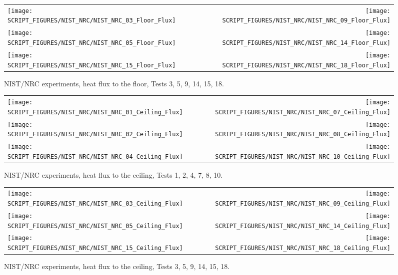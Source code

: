 \begin{figure}[p]
\begin{tabular*}{\textwidth}{l@{\extracolsep{\fill}}r}
\texttt{[image: SCRIPT\_FIGURES/NIST\_NRC/NIST\_NRC\_03\_Floor\_Flux]} &
\texttt{[image: SCRIPT\_FIGURES/NIST\_NRC/NIST\_NRC\_09\_Floor\_Flux]} \\
\texttt{[image: SCRIPT\_FIGURES/NIST\_NRC/NIST\_NRC\_05\_Floor\_Flux]} &
\texttt{[image: SCRIPT\_FIGURES/NIST\_NRC/NIST\_NRC\_14\_Floor\_Flux]} \\
\texttt{[image: SCRIPT\_FIGURES/NIST\_NRC/NIST\_NRC\_15\_Floor\_Flux]} &
\texttt{[image: SCRIPT\_FIGURES/NIST\_NRC/NIST\_NRC\_18\_Floor\_Flux]}
\end{tabular*}
\caption{NIST/NRC experiments, heat flux to the floor, Tests 3, 5, 9, 14, 15, 18.}
\label{NIST_NRC_Floor_Flux_Open}
\end{figure}


\begin{figure}[p]
\begin{tabular*}{\textwidth}{l@{\extracolsep{\fill}}r}
\texttt{[image: SCRIPT\_FIGURES/NIST\_NRC/NIST\_NRC\_01\_Ceiling\_Flux]} &
\texttt{[image: SCRIPT\_FIGURES/NIST\_NRC/NIST\_NRC\_07\_Ceiling\_Flux]} \\
\texttt{[image: SCRIPT\_FIGURES/NIST\_NRC/NIST\_NRC\_02\_Ceiling\_Flux]} &
\texttt{[image: SCRIPT\_FIGURES/NIST\_NRC/NIST\_NRC\_08\_Ceiling\_Flux]} \\
\texttt{[image: SCRIPT\_FIGURES/NIST\_NRC/NIST\_NRC\_04\_Ceiling\_Flux]} &
\texttt{[image: SCRIPT\_FIGURES/NIST\_NRC/NIST\_NRC\_10\_Ceiling\_Flux]}
\end{tabular*}
\caption{NIST/NRC experiments, heat flux to the ceiling, Tests 1, 2, 4, 7, 8, 10.}
\label{NIST_NRC_Ceiling_Flux_Closed}
\end{figure}

\begin{figure}[p]
\begin{tabular*}{\textwidth}{l@{\extracolsep{\fill}}r}
\texttt{[image: SCRIPT\_FIGURES/NIST\_NRC/NIST\_NRC\_03\_Ceiling\_Flux]} &
\texttt{[image: SCRIPT\_FIGURES/NIST\_NRC/NIST\_NRC\_09\_Ceiling\_Flux]} \\
\texttt{[image: SCRIPT\_FIGURES/NIST\_NRC/NIST\_NRC\_05\_Ceiling\_Flux]} &
\texttt{[image: SCRIPT\_FIGURES/NIST\_NRC/NIST\_NRC\_14\_Ceiling\_Flux]} \\
\texttt{[image: SCRIPT\_FIGURES/NIST\_NRC/NIST\_NRC\_15\_Ceiling\_Flux]} &
\texttt{[image: SCRIPT\_FIGURES/NIST\_NRC/NIST\_NRC\_18\_Ceiling\_Flux]}
\end{tabular*}
\caption{NIST/NRC experiments, heat flux to the ceiling, Tests 3, 5, 9, 14, 15, 18.}
\label{NIST_NRC_Ceiling_Flux_Open}
\end{figure}

